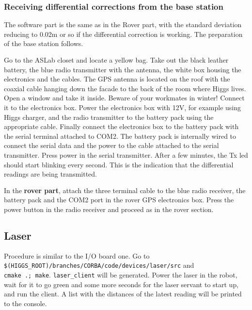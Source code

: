 \subsubsection{Receiving differential corrections from the base station}
The software part is the same as in the Rover part, with the standard deviation reducing to 0.02m or so if the differential correction is working. The preparation of the base station follows.

Go to the ASLab closet and locate a yellow bag. Take out the black leather battery, the blue radio transmitter with the antenna, the white box housing the electronics and the cables. The GPS antenna is located on the roof with the coaxial cable hanging down the facade to the back of the room where Higgs lives. Open a window and take it inside. Beware of your workmates in winter! Connect it to the electronics box. Power the electronics box with 12V, for example using Higgs charger, and the radio transmitter to the battery pack using the appropriate cable. Finally connect the electronics box to the battery pack with the serial terminal attached to COM2. The battery pack is internally wired to connect the serial data and the power to the cable attached to the serial transmitter. Press power in the serial transmitter. After a few minutes, the Tx led should start blinking every second. This is the indication that the differential readings are being transmitted.

In the \textbf{rover part}, attach the three terminal cable to the blue radio receiver, the battery pack and the COM2 port in the rover GPS electronics box. Press the power button in the radio receiver and proceed as in the rover section.

\subsection{Laser}
Procedure is similar to the I/O board one. Go to \\ \texttt{\$(HIGGS\_ROOT)/branches/CORBA/code/devices/laser/src}
and \\ \texttt{cmake .; make}. \texttt{laser\_client} will be generated. Power the laser in the robot, wait for it to go green and some more seconds for the laser servant to start up, and run the client. A list with the distances of the latest reading will be printed to the console.

